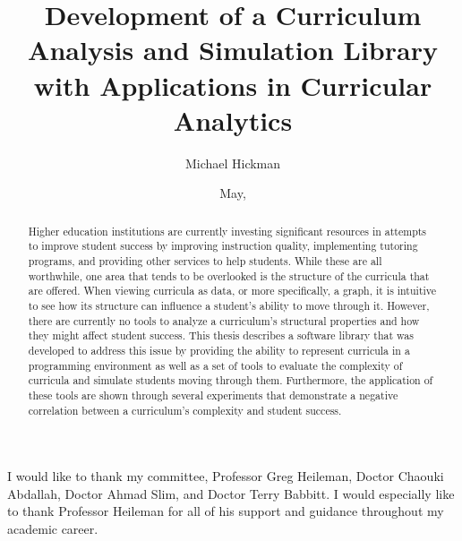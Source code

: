 \documentclass[botnum, fleqn]{unmeethesis}
\begin{document}
\frontmatter

\title{Development of a Curriculum Analysis and Simulation Library with Applications in Curricular Analytics}
\author{Michael Hickman}
\date{May, \thisyear}

\maketitle
\makecopyright




\begin{acknowledgments}
  \vspace{1.1in}
  I would like to thank my committee, Professor Greg Heileman, Doctor Chaouki Abdallah, Doctor Ahmad Slim, and Doctor Terry Babbitt. I would especially like to thank Professor Heileman for all of his support and guidance throughout my academic career.
\end{acknowledgments}


\maketitleabstract

\begin{abstract}
  Higher education institutions are currently investing significant resources in attempts to improve student success by improving instruction quality, implementing tutoring programs, and providing other services to help students. While these are all worthwhile, one area that tends to be overlooked is the structure of the curricula that are offered. When viewing curricula as data, or more specifically, a graph, it is intuitive to see how its structure can influence a student's ability to move through it. However, there are currently no tools to analyze a curriculum's structural properties and how they might affect student success. This thesis describes a software library that was developed to address this issue by providing the ability to represent curricula in a programming environment as well as a set of tools to evaluate the complexity of curricula and simulate students moving through them. Furthermore, the application of these tools are shown through several experiments that demonstrate a negative correlation between a curriculum's complexity and student success.

  \clearpage
\end{abstract}
\end{document}
